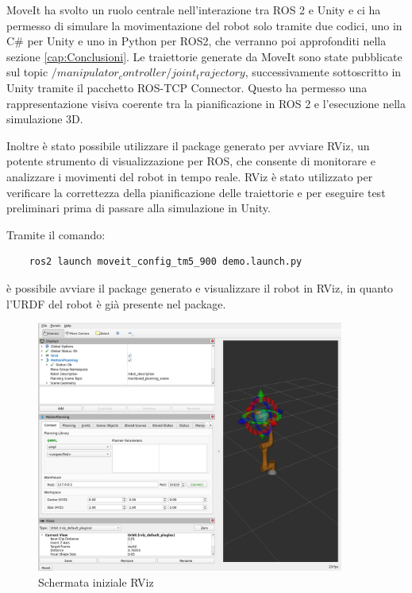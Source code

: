\documentclass[11pt]{report}
\begin{document}
MoveIt ha svolto un ruolo centrale nell’interazione tra ROS 2 e Unity e ci ha permesso di simulare la movimentazione del robot solo tramite due codici, uno in C\# per Unity e uno in Python per ROS2, che verranno poi approfonditi nella sezione \ref{cap:Conclusioni}. Le traiettorie generate da MoveIt sono state pubblicate sul topic $/manipulator_controller/joint_trajectory$, successivamente sottoscritto in Unity tramite il pacchetto ROS-TCP Connector. Questo ha permesso una rappresentazione visiva coerente tra la pianificazione in ROS 2 e l’esecuzione nella simulazione 3D.

Inoltre è stato possibile utilizzare il package generato per avviare RViz, un potente strumento di visualizzazione per ROS, che consente di monitorare e analizzare i movimenti del robot in tempo reale. RViz è stato utilizzato per verificare la correttezza della pianificazione delle traiettorie e per eseguire test preliminari prima di passare alla simulazione in Unity.

Tramite il comando:
\begin{verbatim}
    ros2 launch moveit_config_tm5_900 demo.launch.py
\end{verbatim}

è possibile avviare il package generato e visualizzare il robot in RViz, in quanto l'URDF del robot è già presente nel package.

\begin{figure}[H]
    \centering
    \includegraphics[width=0.9\textwidth]{images/rviz_1.PNG}
    \caption{Schermata iniziale RViz}
    \label{fig:rviz_1}
\end{figure}
\end{document}
